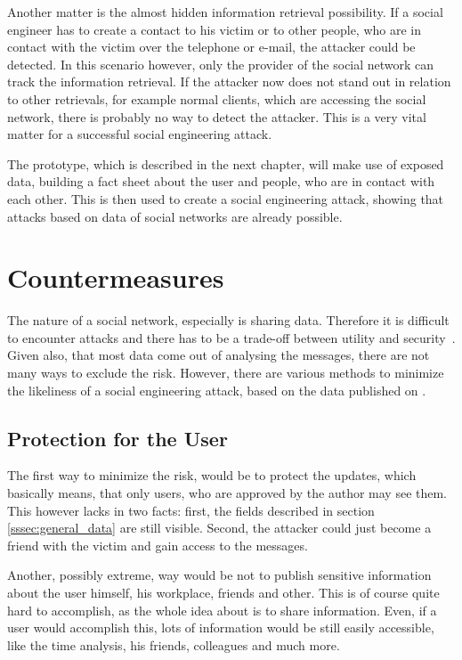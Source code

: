 Another matter is the almost hidden information retrieval possibility. If a
social engineer has to create a contact to his victim or to other people, who
are in contact with the victim over the telephone or e-mail, the attacker could
be detected. In this scenario however, only the provider of the social network
can track the information retrieval. If the attacker now does not stand out in
relation to other retrievals, for example normal clients, which are accessing the social
network, there is probably no way to detect the attacker. This is a very vital
matter for a successful social engineering attack.

The prototype, which is described in the next chapter, will make use of exposed
data, building a fact sheet about the user and people, who are in contact with
each other. This is then used to create a social engineering attack, showing
that attacks based on data of social networks are already possible.

\section{Countermeasures}

The nature of a social network, especially \Twitter{} is sharing data.
Therefore it is difficult to encounter attacks and there has to be a trade-off
between utility and security~\cite{brown2008}. Given also, that most data come
out of analysing the messages, there are not many ways to exclude the risk.
However, there are various methods to minimize the likeliness of a social
engineering attack, based on the data published on \Twitter{}.

\subsection{Protection for the User}

The first way to minimize the risk, would be to protect the updates, which
basically means, that only users, who are approved by the author may see them.
This however lacks in two facts: first, the fields described in section
\ref{sssec:general_data} are still visible. Second, the attacker could just
become a friend with the victim and gain access to the messages.

Another, possibly extreme, way would be not to publish sensitive information
about the user himself, his workplace, friends and other. This is of course
quite hard to accomplish, as the whole idea about \Twitter{} is to share
information. Even, if a user would accomplish this, lots of information would
be still easily accessible, like the time analysis, his friends, colleagues
and much more.

